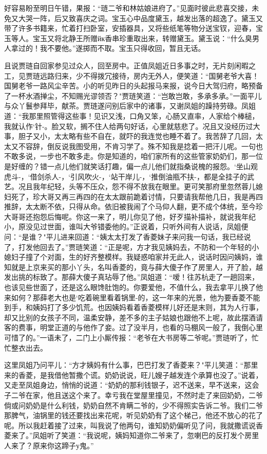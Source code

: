 好容易盼至明日午错，果报：“琏二爷和林姑娘进府了。”见面时彼此悲喜交接，未免又大哭一阵，后又致喜庆之词。宝玉心中品度黛玉，越发出落的超逸了。黛玉又带了许多书籍来，忙着打扫卧室，安插器具，又将些纸笔等物分送宝钗，迎春，宝玉等人。宝玉又将北静王所赠йк香串珍重取出来，转赠黛玉。黛玉说：“什么臭男人拿过的！我不要他。”遂掷而不取。宝玉只得收回，暂且无话。

且说贾琏自回家参见过众人，回至房中。正值凤姐近日多事之时，无片刻闲暇之工，见贾琏远路归来，少不得拨冗接待，房内无外人，便笑道：“国舅老爷大喜！国舅老爷一路风尘辛苦。小的听见昨日的头起报马来报，说今日大驾归府，略预备了一杯水酒掸尘，不知赐光谬领否？"贾琏笑道：“岂敢岂敢，多承多承。”一面平儿与众丫鬟参拜毕，献茶。贾琏遂问别后家中的诸事，又谢凤姐的躁持劳碌。凤姐道：“我那里照管得这些事！见识又浅，口角又笨，心肠又直率，人家给个棒槌，我就认作`针-。脸又软，搁不住人给两句好话，心里就慈悲了。况且又没经历过大事，胆子又小，太太略有些不自在，就吓的我连觉也睡不着了。我苦辞了几回，太太又不容辞，倒反说我图受用，不肯习学了。殊不知我是捻着一把汗儿呢。一句也不敢多说，一步也不敢多走。你是知道的，咱们家所有的这些管家奶奶们，那一位是好缠的？错一点儿他们就笑话打趣，偏一点儿他们就指桑说槐的报怨。`坐山观虎斗-，`借剑杀人-，`引风吹火-，`站干岸儿-，`推倒油瓶不扶-，都是全挂子的武艺。况且我年纪轻，头等不压众，怨不得不放我在眼里。更可笑那府里忽然蓉儿媳妇死了，珍大哥又再三再四的在太太跟前跪着讨情，只要请我帮他几日，我是再四推辞，太太断不依，只得从命。依旧被我闹了个马仰人翻，更不成个体统，至今珍大哥哥还抱怨后悔呢。你这一来了，明儿你见了他，好歹描补描补，就说我年纪小，原没见过世面，谁叫大爷错委他的。”正说着，只听外间有人说话，凤姐便问：“是谁？"平儿进来回道：“姨太太打发了香菱妹子来问我一句话，我已经说了，打发他回去了。”贾琏笑道：“正是呢，方才我见姨妈去，不防和一个年轻的小媳妇子撞了个对面，生的好齐整模样。我疑惑咱家并无此人，说话时因问姨妈，谁知就是上京来买的那小丫头，名叫香菱的，竟与薛大傻子作了房里人，开了脸，越发出挑的标致了。那薛大傻子真玷辱了他。”凤姐道：“嗳！往苏杭走了一趟回来，也该见些世面了，还是这么眼馋肚饱的。你要爱他，不值什么，我去拿平儿换了他来如何？那薛老大也是`吃着碗里看着锅里-的，这一年来的光景，他为要香菱不能到手，和姨妈打了多少饥荒。也因姨妈看着香菱模样儿好还是末则，其为人行事，却又比别的女孩子不同，温柔安静，差不多的主子姑娘也跟他不上呢，故此摆酒请客的费事，明堂正道的与他作了妾。过了没半月，也看的马棚风一般了，我倒心里可惜了的。”一语未了，二门上小厮传报：“老爷在大书房等二爷呢。”贾琏听了，忙忙整衣出去。

这里凤姐乃问平儿：“方才姨妈有什么事，巴巴打发了香菱来？"平儿笑道：“那里来的香菱，是我借他暂撒个谎。奶奶说说，旺儿嫂子越发连个承算也没了。”说着，又走至凤姐身边，悄悄的说道：“奶奶的那利钱银子，迟不送来，早不送来，这会子二爷在家，他且送这个来了。幸亏我在堂屋里撞见，不然时走了来回奶奶，二爷倘或问奶奶是什么利钱，奶奶自然不肯瞒二爷的，少不得照实告诉二爷。我们二爷那脾气，油锅里的钱还要找出来花呢，听见奶奶有了这个梯己，他还不放心的花了呢。所以我赶着接了过来，叫我说了他两句，谁知奶奶偏听见了问，我就撒谎说香菱来了。”凤姐听了笑道：“我说呢，姨妈知道你二爷来了，忽喇巴的反打发个房里人来了？原来你这蹄子у鬼。”


